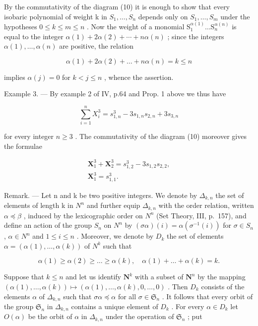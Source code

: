 By the commutativity of the diagram (10) it is enough to show that every isobaric polynomial of weight k in \(S_{1}, \ldots, S_{n}\) depends only on \(S_{1}, \ldots, S_{m}\) under the hypotheses \(0 \leqslant k \leqslant m \leqslant n\) . Now the weight of a monomial \(\mathrm{S}_{1}^{\alpha(1)} \ldots \mathrm{S}_{n}^{\alpha(n)}\) is equal to the integer \(\alpha(1) + 2\alpha(2) + \cdots + n\alpha(n)\) ; since the integers \(\alpha(1), \ldots, \alpha(n)\) are positive, the relation

\[
\alpha (1) + 2 \alpha (2) + \dots + n \alpha (n) = k \leqslant n
\]

implies \(\alpha(j) = 0\) for \(k < j \leqslant n\) , whence the assertion.

Example 3. --- By example 2 of IV, p.64 and Prop. 1 above we thus have

\[
\sum_ {i = 1} ^ {n} X _ {i} ^ {3} = s _ {1, n} ^ {3} - 3 s _ {1, n} s _ {2, n} + 3 s _ {3, n}
\]

for every integer \(n \geqslant 3\) . The commutativity of the diagram (10) moreover gives the formulae

\[
\begin{array}{c} \mathbf {X} _ {1} ^ {3} + \mathbf {X} _ {2} ^ {3} = s _ {1, 2} ^ {3} - 3 s _ {1, 2} s _ {2, 2}, \\ \mathbf {X} _ {1} ^ {3} = s _ {1, 1} ^ {3}. \end{array}
\]

Remark. --- Let n and k be two positive integers. We denote by \(\Delta_{k,n}\) the set of elements of length k in \(N^{n}\) and further equip \(\Delta_{k,n}\) with the order relation, written \(\alpha \preccurlyeq \beta\) , induced by the lexicographic order on \(N^{n}\) (Set Theory, III, p.~157), and define an action of the group \(S_{n}\) on \(N^{n}\) by \((\sigma\alpha)(i) = \alpha(\sigma^{-1}(i))\) for \(\sigma \in S_{n}\) , \(\alpha \in N^{n}\) and \(1 \leqslant i \leqslant n\) . Moreover, we denote by \(D_{k}\) the set of elements \(\alpha = (\alpha(1), \ldots, \alpha(k))\) of \(N^{k}\) such that

\[
\alpha (1) \geqslant \alpha (2) \geqslant \dots \geqslant \alpha (k), \quad \alpha (1) + \dots + \alpha (k) = k.
\]

Suppose that \(k \leqslant n\) and let us identify \(\mathbf{N}^k\) with a subset of \(\mathbf{N}^n\) by the mapping \((\alpha(1), \ldots, \alpha(k)) \mapsto (\alpha(1), \ldots, \alpha(k), 0, \ldots, 0)\) . Then \(D_k\) consists of the elements \(\alpha\) of \(\Delta_{k,n}\) such that \(\sigma \alpha \preccurlyeq \alpha\) for all \(\sigma \in \mathfrak{S}_n\) . It follows that every orbit of the group \(\mathfrak{S}_n\) in \(\Delta_{k,n}\) contains a unique element of \(D_k\) . For every \(\alpha \in D_k\) let \(O(\alpha)\) be the orbit of \(\alpha\) in \(\Delta_{k,n}\) under the operation of \(\mathfrak{S}_n\) ; put

